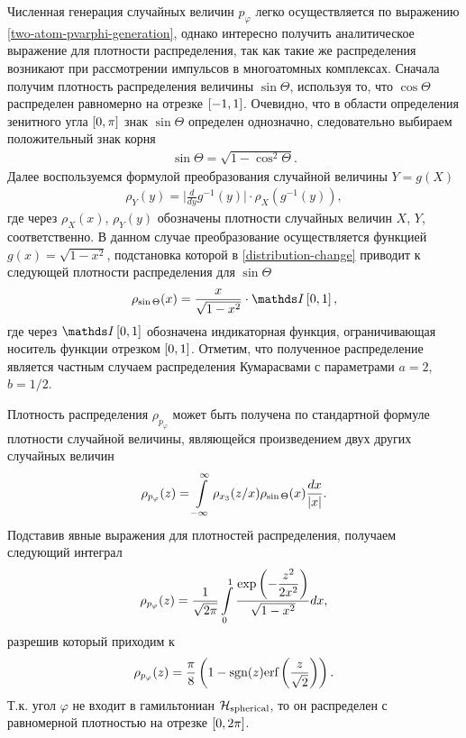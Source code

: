 Численная генерация случайных величин $p_\varphi$ легко осуществляется по выражению \eqref{two-atom-pvarphi-generation}, однако интересно получить аналитическое выражение для плотности распределения, так как такие же распределения возникают при рассмотрении импульсов в многоатомных комплексах. Сначала получим плотность распределения величины $\sin \Theta$, используя то, что $\cos \Theta$ распределен равномерно на отрезке $\left[ -1, 1\right]$. Очевидно, что в области определения зенитного угла $\left[ 0, \pi \right]$ знак $\sin \Theta$ определен однозначно, следовательно выбираем положительный знак корня 
\begin{gather}
    \sin \Theta = \sqrt{ 1 - \cos^2 \Theta}.
\end{gather}
Далее воспользуемся формулой преобразования случайной величины $Y = g(X)$
\begin{gather}
    \rho_Y(y) = \Big\vert \frac{d}{dy} g^{-1}(y) \Big\vert \cdot \rho_X(g^{-1}(y)), \label{distribution-change}
\end{gather}
%
где через $\rho_X(x)$, $\rho_Y(y)$ обозначены плотности случайных величин $X$, $Y$, соответственно. В данном случае преобразование осуществляется функцией $g(x) = \sqrt{1 - x^2}$, подстановка которой в \eqref{distribution-change} приводит к следующей плотности распределения для $\sin \Theta$ 
\begin{gather}
    \rho_{\sin \Theta}(x) = \frac{x}{\sqrt{1 - x^2}} \cdot \bbI\lsq 0, 1\rsq,
\end{gather}
% 
где через $\bbI\lsq 0, 1 \rsq$ обозначена индикаторная функция, ограничивающая носитель функции отрезком $\left[ 0, 1 \right]$. Отметим, что полученное распределение является частным случаем распределения Кумарасвами с параметрами $a = 2$, $b = 1/2$. \par
Плотность распределения $\rho_{p_\varphi}$ может быть получена по стандартной формуле плотности случайной величины, являющейся произведением двух других случайных величин
\begin{gather}
    \rho_{p_\varphi}(z) = \int\limits_{-\infty}^\infty \rho_{x_3}(z/x) \rho_{\sin \Theta}(x) \frac{dx}{\vert x \vert}.
\end{gather}
Подставив явные выражения для плотностей распределения, получаем следующий интеграл
\begin{gather}
    \rho_{p_\varphi}(z) = \frac{1}{\sqrt{2 \pi}} \int\limits_0^1 \frac{\displaystyle \exp \left( -\frac{z^2}{2x^2} \right)}{\sqrt{1 - x^2}} dx,
\end{gather}
%
разрешив который приходим к
\begin{gather}
    \rho_{p_\varphi}(z) = \frac{\pi}{8} \left( 1 - \text{sgn}(z) \text{erf} \left( \frac{z}{\sqrt{2}} \right) \right).
\end{gather}
Т.к. угол $\varphi$ не входит в гамильтониан $\mathcal{H}_\text{spherical}$, то он распределен с равномерной плотностью на отрезке $\left[ 0, 2 \pi \right]$.

